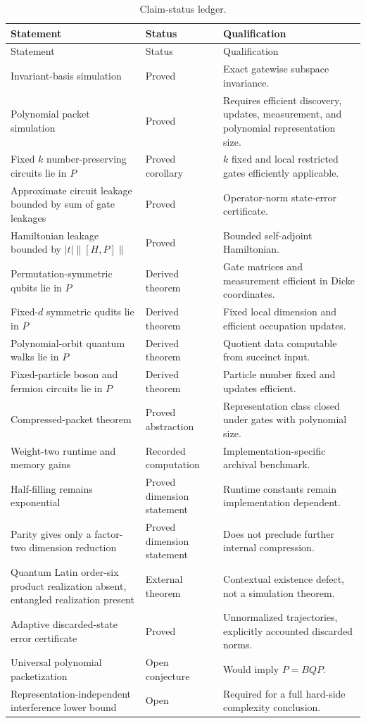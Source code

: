 \begin{longtable}{@{}L{.31\textwidth}L{.16\textwidth}L{.43\textwidth}@{}}
\caption{Claim-status ledger.}\\
\toprule
Statement & Status & Qualification\\
\midrule
\endfirsthead
\toprule
Statement & Status & Qualification\\
\midrule
\endhead
Invariant-basis simulation & Proved & Exact gatewise subspace invariance.\\
Polynomial packet simulation & Proved & Requires efficient discovery, updates, measurement, and polynomial representation size.\\
Fixed $k$ number-preserving circuits lie in $P$ & Proved corollary & $k$ fixed and local restricted gates efficiently applicable.\\
Approximate circuit leakage bounded by sum of gate leakages & Proved & Operator-norm state-error certificate.\\
Hamiltonian leakage bounded by $|t|\|[H,P]\|$ & Proved & Bounded self-adjoint Hamiltonian.\\
Permutation-symmetric qubits lie in $P$ & Derived theorem & Gate matrices and measurement efficient in Dicke coordinates.\\
Fixed-$d$ symmetric qudits lie in $P$ & Derived theorem & Fixed local dimension and efficient occupation updates.\\
Polynomial-orbit quantum walks lie in $P$ & Derived theorem & Quotient data computable from succinct input.\\
Fixed-particle boson and fermion circuits lie in $P$ & Derived theorem & Particle number fixed and updates efficient.\\
Compressed-packet theorem & Proved abstraction & Representation class closed under gates with polynomial size.\\
Weight-two runtime and memory gains & Recorded computation & Implementation-specific archival benchmark.\\
Half-filling remains exponential & Proved dimension statement & Runtime constants remain implementation dependent.\\
Parity gives only a factor-two dimension reduction & Proved dimension statement & Does not preclude further internal compression.\\
Quantum Latin order-six product realization absent, entangled realization present & External theorem & Contextual existence defect, not a simulation theorem.\\
Adaptive discarded-state error certificate & Proved & Unnormalized trajectories, explicitly accounted discarded norms.\\
Universal polynomial packetization & Open conjecture & Would imply $P=BQP$.\\
Representation-independent interference lower bound & Open & Required for a full hard-side complexity conclusion.\\
\bottomrule
\end{longtable}

